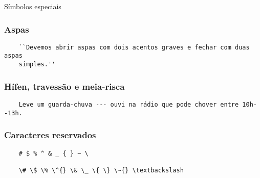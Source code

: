 \begin{frame}[standout]
  \Huge
  Símbolos especiais
\end{frame}

\begin{frame}[fragile]
  \frametitle{Aspas}
  \begin{verbatim}
    ``Devemos abrir aspas com dois acentos graves e fechar com duas aspas
    simples.''
  \end{verbatim}
\end{frame}

\begin{frame}[fragile]
  \frametitle{Hífen, travessão e meia-risca}
  \begin{verbatim}
    Leve um guarda-chuva --- ouvi na rádio que pode chover entre 10h--13h.
  \end{verbatim}
\end{frame}

\begin{frame}[fragile]
  \frametitle{Caracteres reservados}
  \begin{verbatim}
    # $ % ^ & _ { } ~ \

    \# \$ \% \^{} \& \_ \{ \} \~{} \textbackslash
  \end{verbatim}
\end{frame}

\begin{frame}[standout]
  \Huge
\end{frame}
